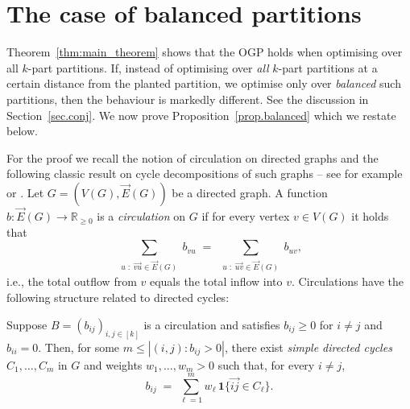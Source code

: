 \documentclass[a4paper,UKenglish,cleveref, autoref, thm-restate,numberwithinsect]{lipics-v2021}
\begin{document}
\section{The case of balanced partitions}
\label{app:balanced}
Theorem~\ref{thm:main_theorem} shows that the OGP holds when optimising over all $k$-part partitions. If, instead of optimising over \emph{all} $k$-part partitions at a certain distance from the planted partition, we optimise only over \emph{balanced} such partitions, then the behaviour is markedly different. See the discussion in Section~\ref{sec.conj}. We now prove Proposition~\ref{prop.balanced} which we restate below.
\propbalanced*


For the proof we recall the notion of circulation on directed graphs and the following classic result on cycle decompositions of such graphs -- see for example \cite[Theorem 1]{gauthier2014decomposition} or \cite[Theorem 11.1 and (11.3)]{Schr03a}. %
Let $G=(V(G),\vec{E}(G))$ be a directed graph. A function $b:\vec{E}(G) \rightarrow \mathbb{R}_{\geq 0}$ is a \emph{circulation} on $G$ if for every vertex $v\in V(G)$ it holds that
\[ 
\sum_{\substack{ 
u\; : \; \vec{vu}\in \vec{E}(G)}} b_{vu}
\;=\;
\sum_{\substack{ 
u \; : \; \vec{uv}\in \vec{E}(G)}} b_{uv},
\]
i.e., the total outflow from $v$ equals the total inflow into $v$. Circulations have the following structure related to directed cycles:
%
%
\begin{lemma}
\label{lem:cycle_decomposition}
Suppose $B=(b_{ij})_{i,j\in[k]}$ is a circulation and satisfies $b_{ij}\ge 0$ for $i\neq j$ and $b_{ii}=0$.
Then, for some $m \leq |(i,j) : b_{ij}>0|$,
 there exist \emph{simple directed cycles} 
$C_1,\dots,C_m$ in $G$ and weights $w_1,\dots,w_m>0$ such that, for every $i\neq j$,
\[
b_{ij} \;=\; \sum_{\ell=1}^m w_\ell \,\mathbf{1}\{ \vec{ij}\in C_\ell\}.
\]
\end{lemma}
\end{document}
